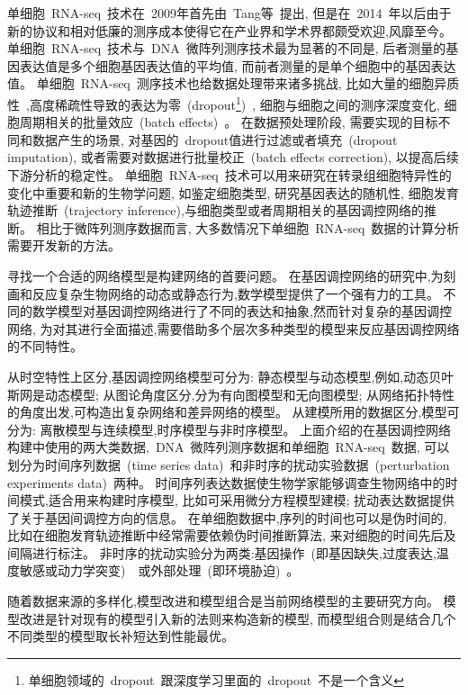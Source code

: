 单细胞~RNA-seq~技术在~2009年首先由~Tang等~\cite{tang2009mrna}提出,
但是在~2014~年以后由于新的协议和相对低廉的测序成本使得它在产业界和学术界都颇受欢迎,风靡至今。
单细胞~RNA-seq~技术与~DNA~微阵列测序技术最为显著的不同是,
后者测量的基因表达值是多个细胞基因表达值的平均值,
而前者测量的是单个细胞中的基因表达值。
单细胞~RNA-seq~测序技术也给数据处理带来诸多挑战,
比如大量的细胞异质性~\cite{wagner2016revealing},高度稀疏性导致的表达为零~(dropout\footnote{单细胞领域的~dropout~跟深度学习里面的~dropout~不是一个含义})~\cite{vallejos2017normalizing}, 细胞与细胞之间的测序深度变化, 细胞周期相关的批量效应~(batch effects)~\cite{buettner2015computational}。
在数据预处理阶段, 需要实现的目标不同和数据产生的场景, 对基因的~dropout值进行过滤或者填充~(dropout imputation), 或者需要对数据进行批量校正~(batch effects correction), 以提高后续下游分析的稳定性。
单细胞~RNA-seq~技术可以用来研究在转录组细胞特异性的变化中重要和新的生物学问题,
如鉴定细胞类型, 研究基因表达的随机性, 细胞发育轨迹推断~(trajectory inference),与细胞类型或者周期相关的基因调控网络的推断。
相比于微阵列测序数据而言, 大多数情况下单细胞~RNA-seq~数据的计算分析需要开发新的方法。

寻找一个合适的网络模型是构建网络的首要问题。
在基因调控网络的研究中,为刻画和反应复杂生物网络的动态或静态行为,数学模型提供了一个强有力的工具。
不同的数学模型对基因调控网络进行了不同的表达和抽象,然而针对复杂的基因调控网络,
为对其进行全面描述,需要借助多个层次多种类型的模型来反应基因调控网络的不同特性。

从时空特性上区分,基因调控网络模型可分为:
静态模型与动态模型,例如,动态贝叶斯网是动态模型;
从图论角度区分,分为有向图模型和无向图模型;
从网络拓扑特性的角度出发,可构造出复杂网络和差异网络的模型。 
从建模所用的数据区分,模型可分为:
离散模型与连续模型,时序模型与非时序模型。
上面介绍的在基因调控网络构建中使用的两大类数据,~DNA~微阵列测序数据和单细胞~RNA-seq~数据, 
可以划分为时间序列数据~(time series data)~和非时序的扰动实验数据~(perturbation experiments data)~两种。
时间序列表达数据使生物学家能够调查生物网络中的时间模式,适合用来构建时序模型, 比如可采用微分方程模型建模; 
扰动表达数据提供了关于基因间调控方向的信息。
在单细胞数据中,序列的时间也可以是伪时间的, 比如在细胞发育轨迹推断中经常需要依赖伪时间推断算法, 来对细胞的时间先后及间隔进行标注。
非时序的扰动实验分为两类:基因操作~(即基因缺失,过度表达,温度敏感或动力学突变)~\cite{holstege1998dissecting}~或外部处理~(即环境胁迫)~\cite{gasch2000genomic}。

随着数据来源的多样化,模型改进和模型组合是当前网络模型的主要研究方向。
模型改进是针对现有的模型引入新的法则来构造新的模型,
而模型组合则是结合几个不同类型的模型取长补短达到性能最优。

